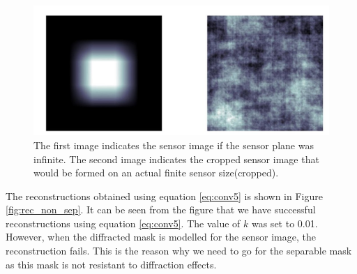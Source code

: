 \begin{figure}[ht]
\includegraphics[scale = 0.50]{pics/sensorCropped}
\caption{The first image indicates the sensor image if the sensor plane was infinite. The second image indicates the cropped sensor image that would be formed on an actual finite sensor size(cropped).}
\label{fig:moon_image}
\end{figure}
The reconstructions obtained using equation \ref{eq:conv5} is shown in Figure \ref{fig:rec_non_sep}. It can be seen from the figure that we have successful reconstructions using equation \ref{eq:conv5}. The value of $k $ was set to 0.01.
However, when the diffracted mask is modelled for the sensor image, the reconstruction fails. This is the reason why we need to go for the separable mask as this mask is not resistant to diffraction effects. 
